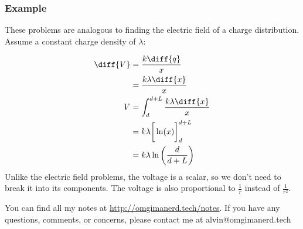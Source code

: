 \documentclass{math}
\begin{document}
\subsubsection*{Example}
These problems are analogous to finding the electric field of a charge
distribution. Assume a constant charge density of \( \lambda \):
\begin{center}
\end{center}
\begin{align*}
  \diff{V} &= \frac{k\diff{q}}{x} \\
  &= \frac{k\lambda\diff{x}}{x} \\
  V &= \int_{d}^{d+L}\frac{k\lambda\diff{x}}{x} \\
  &= k\lambda\bigg[\ln(x)\bigg]_{d}^{d+L} \\
  &= k\lambda\ln\bigg(\frac{d}{d+L}\bigg)
\end{align*}
Unlike the electric field problems, the voltage is a scalar, so we don't need
to break it into its components. The voltage is also proportional to
\( \frac{1}{r} \) instead of \( \frac{1}{r^2} \).

\begin{center}
  You can find all my notes at \url{http://omgimanerd.tech/notes}. If you have
  any questions, comments, or concerns, please contact me at
  alvin@omgimanerd.tech
\end{center}
\end{document}
